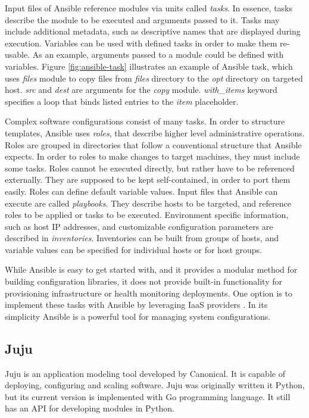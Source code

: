 Input files of Ansible reference modules via units called \textit{tasks}. In
essence, tasks describe the module to be executed and arguments passed to
it. Tasks may include additional metadata, such as descriptive names that are
displayed during execution. Variables can be used with defined tasks in order
to make them re-usable. As an example, arguments passed to a module could be
defined with variables. Figure \ref{fig:ansible-task} illustrates an example of
Ansible task, which uses \textit{files} module to copy files from
\textit{files} directory to the \textit{opt} directory on targeted host.
\textit{src} and \textit{dest} are arguments for the \textit{copy} module.
\textit{with\_items} keyword specifies a loop that binds listed entries to the
\textit{item} placeholder.

Complex software configurations consist of many tasks. In order to structure
templates, Ansible uses \textit{roles}, that describe higher level
administrative operations. Roles are grouped in directories that follow a
conventional structure that Ansible expects. In order to roles to make changes
to target machines, they must include some tasks. Roles cannot be executed
directly, but rather have to be referenced externally. They are supposed to be
kept self-contained, in order to port them easily. Roles can define default
variable values. Input files that Ansible can execute are called
\textit{playbooks}. They describe hosts to be targeted, and reference roles to
be applied or tasks to be executed. Environment specific information, such as
host IP addresses, and customizable configuration parameters are described in
\textit{inventories}. Inventories can be built from groups of hosts, and
variable values can be specified for individual hosts or for host groups.

While Ansible is easy to get started with, and it provides a modular method for
building configuration libraries, it does not provide built-in functionality
for provisioning infrastructure or health monitoring deployments. One option is
to implement these tasks with Ansible by leveraging IaaS providers
\cite{singh2015automated}. In its simplicity Ansible is a powerful tool for
managing system configurations.

\subsection{Juju}

Juju \cite{juju} is an application modeling tool developed by Canonical. It is
capable of deploying, configuring and scaling software. Juju was originally
written it Python, but its current version is implemented with Go programming
language. It still has an API for developing modules in Python.

